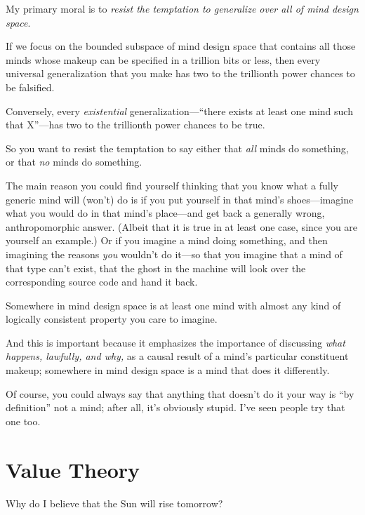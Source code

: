 {
 My primary moral is to \textit{resist the temptation to generalize
over all of mind design space}.}

{
 If we focus on the bounded subspace of mind design space that
contains all those minds whose makeup can be specified in a trillion
bits or less, then every universal generalization that you make has two
to the trillionth power chances to be falsified.}

{
 Conversely, every \textit{existential}
generalization---``there exists at least one mind such
that X''---has two to the trillionth power chances to
be true.}

{
 So you want to resist the temptation to say either that
\textit{all} minds do something, or that \textit{no} minds do
something.}

{
 The main reason you could find yourself thinking that you know
what a fully generic mind will (won't) do is if you put
yourself in that mind's shoes---imagine what you would
do in that mind's place---and get back a generally
wrong, anthropomorphic answer. (Albeit that it is true in at least one
case, since you are yourself an example.) Or if you imagine a mind
doing something, and then imagining the reasons \textit{you}
wouldn't do it---so that you imagine that a mind of
that type can't exist, that the ghost in the machine
will look over the corresponding source code and hand it back.}

{
 Somewhere in mind design space is at least one mind with almost
any kind of logically consistent property you care to imagine.}

{
 And this is important because it emphasizes the importance of
discussing \textit{what happens, lawfully, and why,} as a causal result
of a mind's particular constituent makeup; somewhere in
mind design space is a mind that does it differently.}

{
 Of course, you could always say that anything that
doesn't do it your way is ``by
definition'' not a mind; after all,
it's obviously stupid. I've seen people
try that one too.}

\myendsectiontext

\chapter{Value Theory}


{
 Why do I believe that the Sun will rise tomorrow? }

